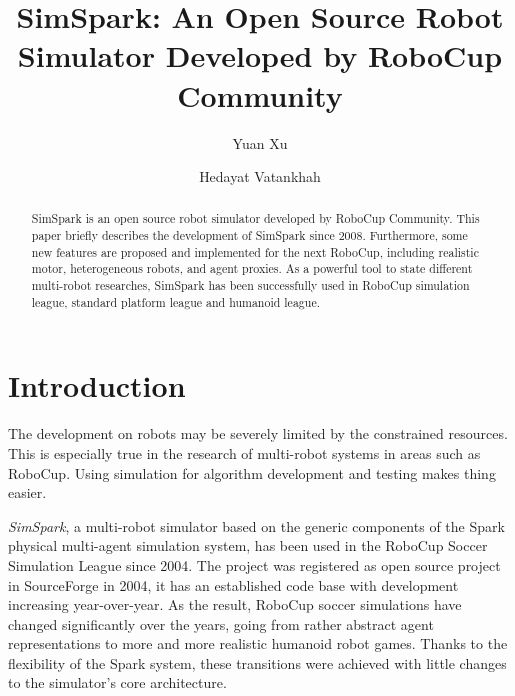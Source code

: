 \documentclass{llncs}
\begin{document}
\title{SimSpark: An Open Source Robot Simulator Developed by RoboCup Community}

\author{Yuan Xu \and Hedayat Vatankhah}


\maketitle

\begin{abstract}
  SimSpark is an open source robot simulator developed by RoboCup Community.
  This paper briefly describes the development of SimSpark since 2008.
  Furthermore, some new features are proposed and implemented for the next RoboCup, including realistic motor, heterogeneous robots, and agent proxies.
  As a powerful tool to state different multi-robot researches, SimSpark has been successfully used in RoboCup simulation league, standard platform league and humanoid league.
\end{abstract}

\section{Introduction}
The development on robots may be severely limited by the constrained resources.
This is especially true in the research of multi-robot systems in areas such as RoboCup.
Using simulation for algorithm development and testing makes thing easier.

\textit{SimSpark}, a multi-robot simulator based on the generic components of the Spark\cite{OR05} physical multi-agent simulation system, has been used in the RoboCup Soccer Simulation League since 2004.
The project was registered as open source project in SourceForge in 2004, it has an established code base with development increasing year-over-year.
As the result, RoboCup soccer simulations have changed significantly over the years, going from rather abstract agent representations to more and more realistic humanoid robot games\cite{Boedecker2008,usermanual}.
Thanks to the flexibility of the Spark system, these transitions were achieved with little changes to the simulator's core architecture.
\end{document}
